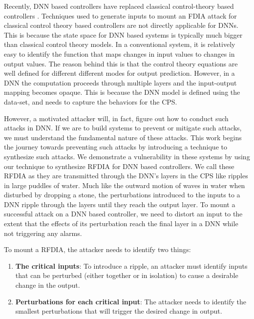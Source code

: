 Recently,  \ac{DNN} based controllers have replaced classical control-theory based controllers \cite{xiang18} \cite{Kocic2019} \cite{bechtel2017deeppicar}.  
Techniques used to generate inputs to mount an FDIA attack for classical control theory based controllers are not directly applicable for DNNs.
This is because the state space for DNN based systems is typically much bigger than classical control theory models. 
In a conventional system, it is relatively easy to identify the function that maps changes in input values to changes in output values. 
The reason behind this is that the control theory equations are well defined for different different modes for output prediction.
However, in a \ac{DNN} the computation proceeds through multiple layers and the input-output mapping becomes opaque. 
This is because the \ac{DNN} model is defined using the data-set, and needs to capture the behaviors for the \ac{CPS}.

However, a motivated attacker will, in fact, figure out how to conduct such attacks in \ac{DNN}. 
If we are to build systems to prevent or mitigate such attacks, we must understand the fundamental nature of these attacks. 
This work begins the journey towards preventing such attacks by introducing a technique to synthesize such attacks. 
We demonstrate a vulnerability in these systems by using our technique to synthesize \ac{RFDIA} for DNN based controllers. 
We call these \ac{RFDIA} as they are transmitted through the DNN's layers in the CPS like ripples in large puddles of water. 
Much like the outward motion of waves in water when disturbed by dropping a stone, the perturbations introduced to the inputs to a DNN ripple through the layers until they reach the output layer. 
To mount a successful attack on a DNN based controller, we need to distort an input to the extent that the effects of its perturbation reach the final layer in a DNN while not triggering any alarms. 


To mount a \ac{RFDIA}, the attacker needs to identify two things: 
\begin{enumerate}
	\item \textbf{The critical inputs}: To introduce a ripple, an attacker must identify inputs that can be perturbed (either together or in isolation) to cause a desirable change in the output.
	\item \textbf{Perturbations for each critical input}: The attacker needs to identify the smallest perturbations that will trigger the desired change in output. 
\end{enumerate}


